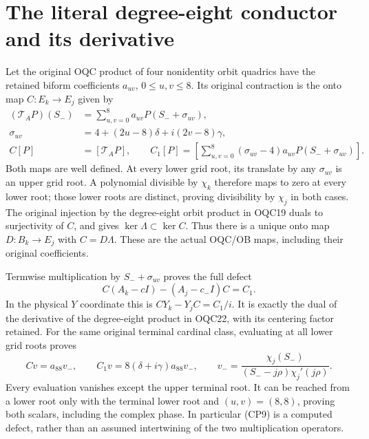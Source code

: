 \documentclass[11pt]{article}
\begin{document}
\section{The literal degree-eight conductor and its derivative}
Let the original OQC product of four nonidentity orbit quadrics have
the retained biform coefficients $a_{uv}$, $0\le u,v\le8$.
Its original contraction is the onto map $C:E_k\to E_j$ given by
\begin{equation}\tag{CP8}
 \begin{split}
 (\mathcal T_AP)(S_-)&=\sum_{u,v=0}^8a_{uv}P(S_-+\sigma_{uv}),\\
 \sigma_{uv}&=4+(2u-8)\delta+i(2v-8)\gamma,\\
 C[P]&=[\mathcal T_AP],\qquad
 C_1[P]=\left[\sum_{u,v=0}^8(\sigma_{uv}-4)a_{uv}
                         P(S_-+\sigma_{uv})\right].
 \end{split}
\end{equation}
Both maps are well defined. At every lower grid root, its translate
by any $\sigma_{uv}$ is an upper grid root. A polynomial divisible by
$\chi_k$ therefore maps to zero at every lower root; those lower roots
are distinct, proving divisibility by $\chi_j$ in both cases.
The original injection by the degree-eight orbit product in OQC19
duals to surjectivity of $C$, and gives
$\ker\Lambda\subset\ker C$. Thus there is a unique onto map
$D:B_k\to E_j$ with $C=D\Lambda$.
These are the actual OQC/OB maps, including their original coefficients.

Termwise multiplication by $S_-+\sigma_{uv}$ proves the full defect
\begin{equation}\tag{CP9}
 \boxed{C(A_k-cI)-(A_j-c_-I)C=C_1.}
\end{equation}
In the physical $Y$ coordinate this is
$CY_k-Y_jC=C_1/i$. It is exactly the dual of the derivative of
the degree-eight product in OQC22, with its centering factor retained.
For the same original terminal cardinal class, evaluating at all lower
grid roots proves
\begin{equation}\tag{CP10}
 Cv=a_{88}v_-,\qquad C_1v=8(\delta+i\gamma)a_{88}v_-,\qquad
 v_-=\frac{\chi_j(S_-)}{(S_--j\rho)\chi_j'(j\rho)}.
\end{equation}
Every evaluation vanishes except the upper terminal root. It can be
reached from a lower root only with the terminal lower root and
$(u,v)=(8,8)$, proving both scalars, including the complex phase.
In particular (CP9) is a computed defect, rather than an assumed
intertwining of the two multiplication operators.
\end{document}
